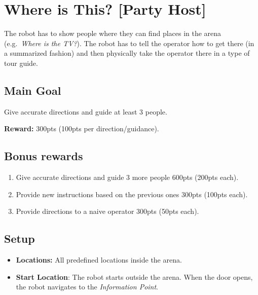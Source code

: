 \section{Where is This? [Party Host]}
\label{test:where-is-this}
The robot has to show people where they can find places in the arena (e.g.~\emph{Where is the TV?}). The robot has to tell the operator how to get there (in a summarized fashion) and then physically take the operator there in a type of tour guide.


\subsection*{Main Goal}
Give accurate directions and guide at least 3 people.

\noindent\textbf{Reward:} 300pts (100pts per direction/guidance).

\subsection*{Bonus rewards}
\begin{enumerate}[nosep]
	\item Give accurate directions and guide 3 more people 600pts (200pts each).
	\item Provide new instructions based on the previous ones 300pts (100pts each).
	\item Provide directions to a naive operator 300pts (50pts each).
\end{enumerate}

\subsection*{Setup}
\begin{itemize}[nosep]
	\item \textbf{Locations:} All predefined locations inside the arena.

	\item \textbf{Start Location}: The robot starts outside the arena. When the door opens, the robot navigates to the \emph{Information Point}.
\end{itemize}

